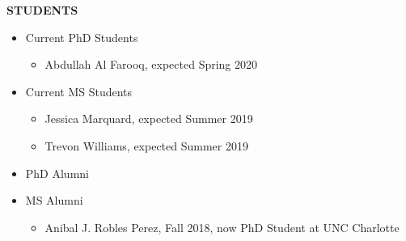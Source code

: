 \documentclass[10pt]{article}
\begin{document}
\vspace{1em} {\Large \textbf{STUDENTS}}
\begin{itemize}
\item Current PhD Students
\begin{itemize}
\item Abdullah Al Farooq, expected Spring 2020
\end{itemize}

\item Current MS Students
\begin{itemize}
\item Jessica Marquard, expected Summer 2019
\item Trevon Williams, expected Summer 2019
\end{itemize}

\item PhD Alumni

\item MS Alumni
\begin{itemize}
\item Anibal J. Robles Perez, Fall 2018, now PhD Student at UNC Charlotte
\end{itemize}

\end{itemize}
\end{document}
